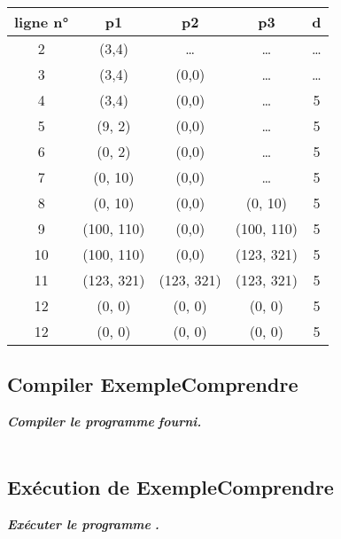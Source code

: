 \documentclass{sebaClass}
\newcommand{\q}[1]{\textit{\textbf{#1}}\\}
\newcommand{\ql}[1]{\textit{\textbf{#1}}}
\newcommand{\rt}[1]{\textcolor{redl}{#1}}
\begin{document}
\begin{table}[h!]
   \centering
   \begin{tabular}{ c | c | c | c | c }
      ligne n° & p1              & p2              & p3              & d      \\ \hline
      2        & \rt{(3,4)}      & \dots           & \dots           & \dots  \\
      3        & (3,4)           & \rt{(0,0)}      & \dots           & \dots  \\
      4        & (3,4)           & (0,0)           & \dots           & \rt{5} \\
      5        & \rt{(9, 2)}     & (0,0)           & \dots           & 5      \\
      6        & (\rt{0}, 2)     & (0,0)           & \dots           & 5      \\
      7        & (0, \rt{10})    & (0,0)           & \dots           & 5      \\
      8        & (0, 10)         & (0,0)           & \rt{(0, 10)}    & 5      \\
      9        & \rt{(100, 110)} & (0,0)           & \rt{(100, 110)} & 5      \\
      10       & (100, 110)      & (0,0)           & \rt{(123, 321)} & 5      \\
      11       & \rt{(123, 321)} & \rt{(123, 321)} & (123, 321)      & 5      \\
      12       & \rt{(0, 0)}     & \rt{(0, 0)}     & \rt{(0, 0)}     & 5      \\
      12       & (0, 0)          & (0, 0)          & (0, 0)          & \rt{5} \\
   \end{tabular}
\end{table}

\subsection{Compiler ExempleComprendre}
\ql{Compiler le programme}  \q{fourni.}
\\

\subsection{Exécution de ExempleComprendre}
\ql{Exécuter le programme}  \q{.}
\\
\end{document}
